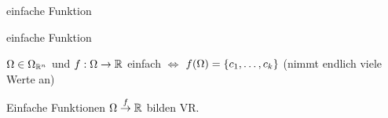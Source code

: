 \documentclass[class=article, crop=false]{standalone}
\begin{document}
\begin{zettel}{einfache Funktion}
\begin{flashcard}[vv6kcxgy]{einfache Funktion}
	\begin{definition}
		$\Omega \in  \Omega_{\mathbb{R}^n} $ und $f : \Omega \to  \mathbb{R} $ einfach $\iff $  $f(\Omega) = \set{ c_1,\dots,c_k}$ (nimmt endlich viele Werte an)
	\end{definition}
\end{flashcard}

\begin{lemma}
	Einfache Funktionen $\Omega \stackrel{f}{\to} \mathbb{R} $ bilden VR.
\end{lemma}

\end{zettel}
\end{document}
